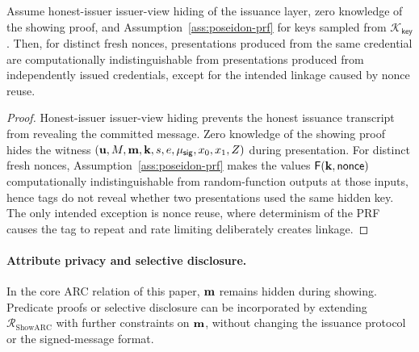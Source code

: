 \begin{proposition}\label{prop:arc-unlinkability}
Assume honest-issuer issuer-view hiding of the issuance layer, zero knowledge of the showing proof, and
Assumption~\ref{ass:poseidon-prf} for keys sampled from \(\mathcal K_{\mathsf{key}}\).  Then, for distinct fresh
nonces, presentations produced from the same credential are computationally indistinguishable from presentations
produced from independently issued credentials, except for the intended linkage caused by nonce reuse.
\end{proposition}

\begin{proof}
Honest-issuer issuer-view hiding prevents the honest issuance transcript from revealing the committed message.
Zero knowledge of the showing proof hides the witness
\((\mathbf{u},M,\mathbf{m},\mathbf{k},s,e,\mu_{\mathsf{sig}},x_0,x_1,Z)\) during presentation.  For distinct fresh nonces,
Assumption~\ref{ass:poseidon-prf} makes the values \(\mathsf{F}(\mathbf{k},\mathsf{nonce})\) computationally indistinguishable from
random-function outputs at those inputs, hence tags do not reveal whether two presentations used the same hidden
key.  The only intended exception is nonce reuse, where determinism of the PRF causes the tag to repeat and rate
limiting deliberately creates linkage.
\end{proof}

\paragraph{Attribute privacy and selective disclosure.}
In the core ARC relation of this paper, \(\mathbf{m}\) remains hidden during showing.  Predicate proofs or selective
disclosure can be incorporated by extending \(\mathcal R_{\mathrm{ShowARC}}\) with further constraints on \(\mathbf{m}\), without
changing the issuance protocol or the signed-message format.
